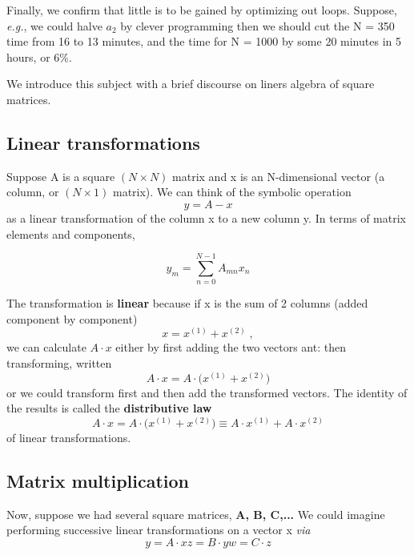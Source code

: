 Finally, we confirm that little is to be gained by optimizing out
loops. Suppose, \textit{e.g.}, we could halve $a_2$ by clever programming
then we should cut the N = 350 time from 16 to 13 minutes, and 
the time for N = 1000 by some 20 minutes in 5 hours, or 6\%.

We introduce this subject with a brief discourse on liners
algebra of square matrices.

\subsection{Linear transformations}
Suppose A is a square $(N\times N)$ matrix and x is an N-dimensional
vector (a column, or $(N\times 1)$ matrix). We can think of the symbolic
operation
\begin{equation}
    \label{eq:09_26}
    y= A -x
\end{equation} 
as a linear transformation of the column x to a new column y. In
terms of matrix elements and components,

\begin{equation}
    \label{eq:09_27}
    y_m = \sum_{n=0}^{N-1} A_{mn} x_n
\end{equation}

The transformation is \textbf{linear} because if x is the sum of 2 columns
(added component by component)
\begin{equation}
    \label{eq:09_28}
    x=x^{(1)}+x^{(2)}\;,
\end{equation}
we can calculate $A \cdot x$ either by first adding the two vectors ant:
then transforming, written
\begin{equation}
    \label{eq:09_29}
    A \cdot x = A \cdot \Big( x^{(1)}+x^{(2)} \Big)
\end{equation}
or we could transform first and then add the transformed vectors.
The identity of the results is called the \textbf{distributive law}
\begin{equation}
    \label{eq:09_30}
    A \cdot x = A \cdot \Big( x^{(1)}+x^{(2)} \Big) \equiv   A \cdot x^{(1)}+ A \cdot x^{(2)} 
\end{equation}
of linear transformations.

\subsection{Matrix multiplication}

Now, suppose we had several square matrices, \textbf{A, B, C,...} We
could imagine performing successive linear transformations on a
vector x \textit{via}
\begin{subequations}
    \begin{equation}
        \label{eq:09_31a}
        y= A \cdot x%
    \end{equation}
    \begin{equation}
        \label{eq:09_31b}
        z= B \cdot y %
    \end{equation}
    \begin{equation}
        \label{eq:09_31c}
        w = C \cdot z  %
    \end{equation}
\end{subequations}

